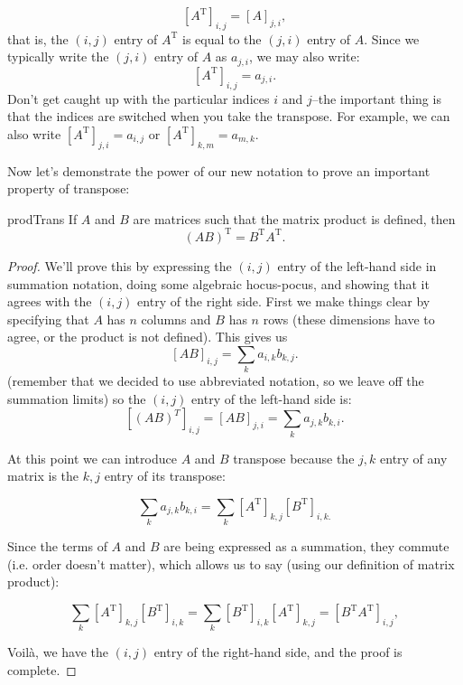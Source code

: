 \[ \left[ {A}^{\text{T}} \right]_{i,j} = \left[ A \right]_{j,i}, \]
that is, the $(i,j)$ entry of $A^{\text{T}}$ is equal to the $(j,i)$ entry of $A$.  Since we typically write the $(j,i)$ entry of $A$ as $a_{j,i}$, we may also write:
\[ \left[ {A}^{\text{T}} \right]_{i,j} = a_{j,i}. \]
Don't get caught up with the particular indices $i$ and $j$--the important thing is that the indices are switched when you take the transpose.  For example, we can also write $\left[ {A}^{\text{T}} \right]_{j,i} = a_{i,j}$ or 
$\left[ {A}^{\text{T}} \right]_{k,m} = a_{m,k}$.

Now let's demonstrate the power of our new notation to prove an important property of transpose:

\begin{prop}{prodTrans}
If $A$ and $B$ are matrices such that the matrix product is defined, then 
\[ \left( {A}{B} \right)^{\text{T}} = {B}^{\text{T}} {A}^{\text{T}}. \]
\end{prop}


\begin{proof}
We'll prove this by expressing the $(i,j)$ entry of the left-hand side in summation notation,  doing some algebraic hocus-pocus, and showing that it agrees with the $(i,j)$ entry of the right side.  First we make things clear by specifying that ${A}$ has $n$ columns and $B$ has $n$ rows (these dimensions have to agree, or the product is not defined). This gives us
\[ \left[ AB \right]_{i,j}= \sum_{k} a_{i,k} b_{k,j}. \]
(remember that we decided to use abbreviated notation, so we leave off the summation limits) so the $(i,j)$ entry of the left-hand side is:
 \[ \left[ (AB)^T \right]_{i,j} = \left[ AB \right]_{j,i} = \sum_{k} a_{j,k} b_{k,i}. \]

At this point we can introduce ${A}$ and ${B}$ transpose  because the $j,k$ entry of any matrix is the $k,j$ entry of its transpose:

\[  \sum_{k} a_{j,k} b_{k,i} =  \sum_{k} \left[A^{\text{T}}\right]_{k,j} \left[B^{\text{T}}\right]_{i,k.} \]

Since the terms of ${A}$ and ${B}$ are being expressed as a summation, they commute (i.e. order doesn't matter), which allows us to say (using our definition of matrix product):

\[ \sum_{k} \left[A^{\text{T}}\right]_{k,j} \left[B^{\text{T}}\right]_{i,k} = \sum_{k} \left[B^{\text{T}}\right]_{i,k}\left[A^{\text{T}}\right]_{k,j} = \left[ {B}^{\text{T}}{A}^{\text{T}} \right]_{i,j}, \]

Voil\`{a}, we have the $(i,j)$ entry of the right-hand side, and the proof is complete.
\end{proof}


